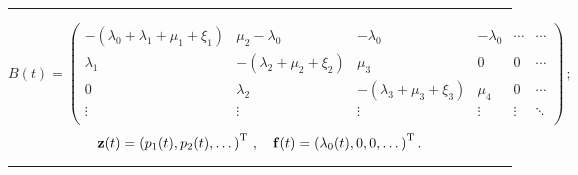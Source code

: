 \vspace*{6pt}

\hrule

\vspace*{6pt}

\noindent
$$
B(t) =
\begin{pmatrix}
 -(\lambda_0+\lambda_1+\mu_1+\xi_1) & \mu_2 -\lambda_0 & -\lambda_0 & -\lambda_0 & \cdots & \cdots\\
  \lambda_1 & -(\lambda_2+\mu_2+\xi_2) & \mu_3 & 0 &  0 &\cdots\\
 0 & \lambda_2 & -(\lambda_3+\mu_3+\xi_3) & \mu_4  & 0  & \cdots \\
\vdots & \vdots & \vdots & \vdots & \vdots & \ddots \\
\end{pmatrix}\,;
$$
$$
{\bf z}(t) = \left(p_1(t),p_2(t),\dots\right)^\mathrm{T}\,,\quad
{\bf f}(t) = \left(\lambda_0(t),0,0,\dots\right)^\mathrm{T}.
$$

\vspace*{3pt}

\hrule


